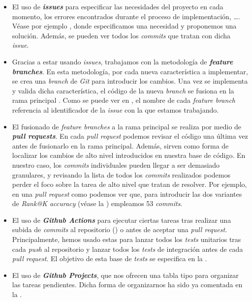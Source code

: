 \begin{itemize}
	\item El uso de \textbf{\textit{issues}} para especificar las necesidades del proyecto en cada momento, los errores encontrados durante el proceso de implementación, \ldots. Véase por ejemplo \cite{informatica:ejemplo_issue_14}, donde especificamos una necesidad y proponemos una solución. Además, se pueden ver todos los \textit{commits} que tratan con dicha \textit{issue}.
	\item Gracias a estar usando \textit{issues}, trabajamos con la metodología de \textbf{\textit{feature branches}}. En esta metodología, por cada nueva característica a implementar, se crea una \textit{branch} de \textit{Git} para introducir los cambios. Una vez se implementa y valida dicha característica, el código de la nueva \textit{branch} se fusiona en la rama principal \cite{informatica:feature_branches}. Como se puede ver en \cite{informatica:repogithub}, el nombre de cada \textit{feature branch} referencia al identificador de la \textit{issue} con la que estamos trabajando.
	\item El fusionado de \textit{feature branches} a la rama principal se realiza por medio de \textbf{\textit{pull requests}}. En cada \textit{pull request} podemos revisar el código una última vez antes de fusionarlo en la rama principal. Además, sirven como forma de localizar los cambios de alto nivel introducidos en nuestra base de código. En nuestro caso, los \textit{commits} individuales pueden llegar a ser demasiado granulares, y revisando la lista de todos los \textit{commits} realizados podemos perder el foco sobre la tarea de alto nivel que tratan de resolver. Por ejemplo, en una \textit{pull request} como \cite{informatica:ejemplo_pr_57} podemos ver que, para introducir las dos variantes de \textit{Rank@K accuracy} (véase la ) empleamos 53 \textit{commits}.
	\item El uso de \textbf{\textit{Github Actions}} para ejecutar ciertas tareas tras realizar una subida de \textit{commits} al repositorio () o antes de aceptar una \textit{pull request}. Principalmente, hemos usado estas  para lanzar todos los \textit{tests} unitarios tras cada \textit{push} al repositorio y lanzar todos los \textit{tests} de integración antes de cada \textit{pull request}. El objetivo de esta base de \textit{tests} se especifica en la .
	\item El uso de \textbf{\textit{Github Projects}}, que nos ofrecen una tabla tipo  para organizar las tareas pendientes. Dicha forma de organizarnos ha sido ya comentada en la .
\end{itemize}

